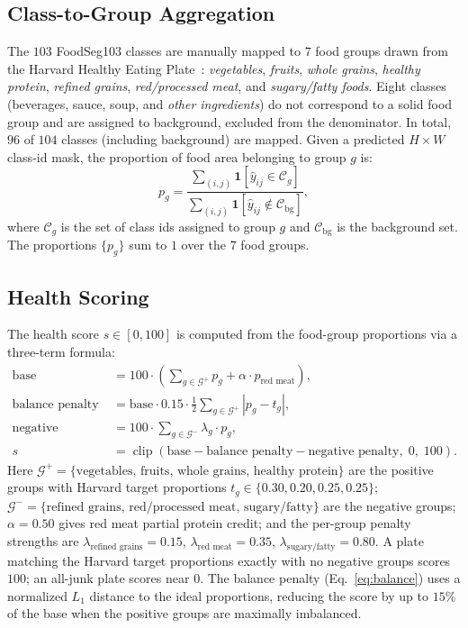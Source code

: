 \subsection{Class-to-Group Aggregation}
\label{sec:mapping}
The $103$ FoodSeg103 classes are manually mapped to $7$ food groups drawn from the Harvard Healthy Eating Plate~\cite{harvardplate}:
\textit{vegetables}, \textit{fruits}, \textit{whole grains}, \textit{healthy protein}, \textit{refined grains}, \textit{red/processed meat}, and \textit{sugary/fatty foods}.
Eight classes (beverages, sauce, soup, and \textit{other ingredients}) do not correspond to a solid food group and are assigned to background, excluded from the denominator.
In total, $96$ of $104$ classes (including background) are mapped.
Given a predicted $H \times W$ class-id mask, the proportion of food area belonging to group $g$ is:
\begin{equation}
    p_g = \frac{\sum_{(i,j)} \mathbf{1}[\hat{y}_{ij} \in \mathcal{C}_g]}{\sum_{(i,j)} \mathbf{1}[\hat{y}_{ij} \notin \mathcal{C}_\text{bg}]},
\end{equation}
where $\mathcal{C}_g$ is the set of class ids assigned to group $g$ and $\mathcal{C}_\text{bg}$ is the background set.
The proportions $\{p_g\}$ sum to $1$ over the $7$ food groups.

\subsection{Health Scoring}
\label{sec:scoring}
The health score $s \in [0, 100]$ is computed from the food-group proportions via a three-term formula:
\begin{align}
    \text{base} &= 100 \cdot \left(\sum_{g \in \mathcal{G}^+} p_g + \alpha \cdot p_\text{red meat}\right), \label{eq:base}\\
    \text{balance penalty} &= \text{base} \cdot 0.15 \cdot \frac{1}{2}\sum_{g \in \mathcal{G}^+}|p_g - t_g|, \label{eq:balance}\\
    \text{negative penalty} &= 100 \cdot \sum_{g \in \mathcal{G}^-} \lambda_g \cdot p_g, \label{eq:neg}\\
    s &= \operatorname{clip}(\text{base} - \text{balance penalty} - \text{negative penalty},\; 0,\; 100). \label{eq:score}
\end{align}
Here $\mathcal{G}^+ = \{\text{vegetables, fruits, whole grains, healthy protein}\}$ are the positive groups with Harvard target proportions $t_g \in \{0.30, 0.20, 0.25, 0.25\}$;
$\mathcal{G}^- = \{\text{refined grains, red/processed meat, sugary/fatty}\}$ are the negative groups;
$\alpha = 0.50$ gives red meat partial protein credit; and
the per-group penalty strengths are $\lambda_\text{refined grains} = 0.15$, $\lambda_\text{red meat} = 0.35$, $\lambda_\text{sugary/fatty} = 0.80$.
A plate matching the Harvard target proportions exactly with no negative groups scores $100$; an all-junk plate scores near $0$.
The balance penalty (Eq.~\ref{eq:balance}) uses a normalized $L_1$ distance to the ideal proportions, reducing the score by up to $15\%$ of the base when the positive groups are maximally imbalanced.

